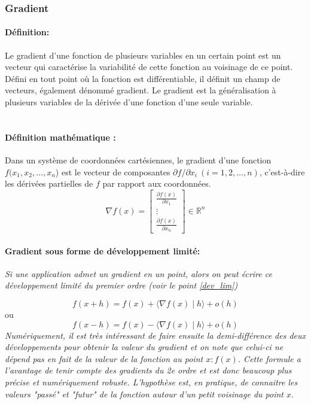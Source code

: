 	\subsubsection{Gradient}\label{grad}
		\paragraph*{Définition:}Le gradient d'une fonction de plusieurs variables en un certain point est un vecteur qui caractérise la variabilité de cette fonction au voisinage de ce point. Défini en tout point où la fonction est différentiable, il définit un champ de vecteurs, également dénommé gradient. Le gradient est la généralisation à plusieurs variables de la dérivée d'une fonction d'une seule variable.\\ \\
		\paragraph*{Définition mathématique :} Dans un système de coordonnées cartésiennes, le gradient d'une fonction {$ f(x_{1},x_{2},\dots ,x_{n}$)} est le vecteur de composantes {$ \partial f/ \partial x_{i}\ (i=1,2,\dots ,n)$}, c'est-à-dire les dérivées partielles de $f$ par rapport aux coordonnées.
		$${\nabla f(x)={
				\begin{bmatrix}
					{\frac {\partial f(x)}{\partial x_{1}}}\\
					\vdots \\
					{\frac {\partial f(x)}{\partial x_{n}}}
				\end{bmatrix}}} \in \mathbb{R}^n $$
		\paragraph*{Gradient sous forme de développement limité:}
		\textit{Si une application admet un gradient en un point, alors on peut écrire ce développement limité du premier ordre (voir le point \ref{dev_lim})}
		
		$${ 
			f(x+h)=f(x)+\langle \nabla f(x)\mid h\rangle +o(h) 
		}$$ 
		ou 
		$$ {  
			f(x-h)=f(x)-\langle \nabla f(x)\mid h\rangle +o(h)
		}$$
		\textit{Numériquement, il est très intéressant de faire ensuite la demi-différence des deux développements pour obtenir la valeur du gradient et on note que celui-ci ne dépend pas en fait de la valeur de la fonction au point $x : f (x)$. Cette formule a l'avantage de tenir compte des gradients du 2e ordre et est donc beaucoup plus précise et numériquement robuste. L'hypothèse est, en pratique, de connaitre les valeurs "passé" et "futur" de la fonction autour d'un petit voisinage du point $x$}.\\

